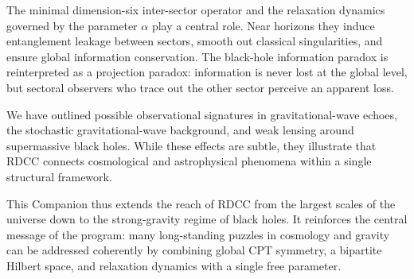 \documentclass[11pt,a4paper]{article}
\begin{document}
The minimal dimension-six inter-sector operator and the relaxation dynamics governed by the 
parameter \(\alpha\) play a central role. Near horizons they induce entanglement leakage between 
sectors, smooth out classical singularities, and ensure global information conservation. The 
black-hole information paradox is reinterpreted as a projection paradox: information is never 
lost at the global level, but sectoral observers who trace out the other sector perceive an 
apparent loss.

We have outlined possible observational signatures in gravitational-wave echoes, the stochastic 
gravitational-wave background, and weak lensing around supermassive black holes. While these 
effects are subtle, they illustrate that RDCC connects cosmological and astrophysical phenomena 
within a single structural framework.

This Companion thus extends the reach of RDCC from the largest scales of the universe down 
to the strong-gravity regime of black holes. It reinforces the central message of the program: 
many long-standing puzzles in cosmology and gravity can be addressed coherently by combining 
global CPT symmetry, a bipartite Hilbert space, and relaxation dynamics with a single free 
parameter.



\nocite{*}

\end{document}
